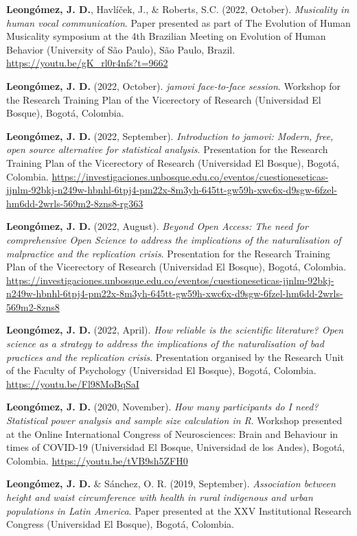 \documentclass[11pt,a4paper,]{awesome-cv}
\begin{document}
\textbf{Leongómez, J. D.}, Havlíček, J., \& Roberts, S.C. (2022,
October). \emph{Musicality in human vocal communication}. Paper
presented as part of The Evolution of Human Musicality symposium at the
4th Brazilian Meeting on Evolution of Human Behavior (University of São
Paulo), São Paulo, Brazil. \url{https://youtu.be/gK_rl0r4nfs?t=9662}

\textbf{Leongómez, J. D.} (2022, October). \emph{jamovi face-to-face
session}. Workshop for the Research Training Plan of the Vicerectory of
Research (Universidad El Bosque), Bogotá, Colombia.

\textbf{Leongómez, J. D.} (2022, September). \emph{Introduction to
jamovi: Modern, free, open source alternative for statistical analysis}.
Presentation for the Research Training Plan of the Vicerectory of
Research (Universidad El Bosque), Bogotá, Colombia.
\url{https://investigaciones.unbosque.edu.co/eventos/cuestioneseticas-jjnlm-92bkj-n249w-hbnhl-6tpj4-pm22x-8m3yh-645tt-gw59h-xwc6x-d9sgw-6fzel-hm6dd-2wrls-569m2-8zns8-rg363}

\textbf{Leongómez, J. D.} (2022, August). \emph{Beyond Open Access: The
need for comprehensive Open Science to address the implications of the
naturalisation of malpractice and the replication crisis}. Presentation
for the Research Training Plan of the Vicerectory of Research
(Universidad El Bosque), Bogotá, Colombia.
\url{https://investigaciones.unbosque.edu.co/eventos/cuestioneseticas-jjnlm-92bkj-n249w-hbnhl-6tpj4-pm22x-8m3yh-645tt-gw59h-xwc6x-d9sgw-6fzel-hm6dd-2wrls-569m2-8zns8}

\textbf{Leongómez, J. D.} (2022, April). \emph{How reliable is the
scientific literature? Open science as a strategy to address the
implications of the naturalisation of bad practices and the replication
crisis}. Presentation organised by the Research Unit of the Faculty of
Psychology (Universidad El Bosque), Bogotá, Colombia.
\url{https://youtu.be/Fl98MoBqSaI}

\textbf{Leongómez, J. D.} (2020, November). \emph{How many participants
do I need? Statistical power analysis and sample size calculation in R}.
Workshop presented at the Online International Congress of
Neurosciences: Brain and Behaviour in times of COVID-19 (Universidad El
Bosque, Universidad de los Andes), Bogotá, Colombia.
\url{https://youtu.be/tVB9sh5ZFH0}

\textbf{Leongómez, J. D.} \& Sánchez, O. R. (2019, September).
\emph{Association between height and waist circumference with health in
rural indigenous and urban populations in Latin America}. Paper
presented at the XXV Institutional Research Congress (Universidad El
Bosque), Bogotá, Colombia.
\end{document}
